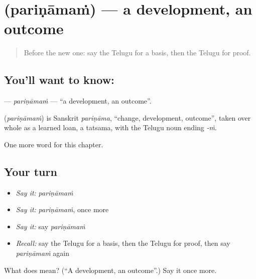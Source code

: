 \section[\texorpdfstring{\te{పరిణామం} (pariṇāmaṁ)}{పరిణామం (pariṇāmaṁ)}]{ (pariṇāmaṁ) — a development, an outcome}

\label{lesson:TE-C219-parinamam}



\begin{quote}
Before the new one: say the Telugu for a basis, then the Telugu for proof.
\end{quote}

\subsection*{You'll want to know: }
\textbf{} — \emph{pariṇāmaṁ} — \textquotedblleft{}a development, an outcome\textquotedblright{}.

\begin{cousinweb}
\textbf{} (\emph{pariṇāmaṁ}) is Sanskrit \emph{pariṇāma}, \textquotedblleft{}change, development, outcome\textquotedblright{}, taken over whole as a learned loan, a tatsama, with the Telugu noun ending \emph{-ṁ}.
\end{cousinweb}

\begin{grammarlens}[title={What you've built}]
One more word for this chapter.
\end{grammarlens}

\subsection*{Your turn}
\begin{itemize}
\raggedright
  \item \emph{Say it:} \emph{pariṇāmaṁ}
  \item \emph{Say it:} \emph{pariṇāmaṁ}, once more
  \item \emph{Say it:} say \emph{pariṇāmaṁ}
  \item \emph{Recall:} say the Telugu for a basis, then the Telugu for proof, then say \emph{pariṇāmaṁ} again
\end{itemize}

\begin{tcolorbox}[breakable,colback=teal!4,colframe=teal!35!black,title={Before you move on}]
What does  mean? (\textquotedblleft{}A development, an outcome\textquotedblright{}.) Say it once more.
\end{tcolorbox}
